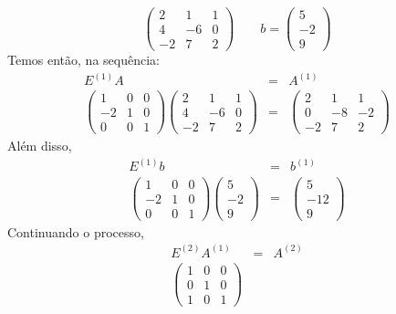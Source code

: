 \begin{exemplo*}
	\begin{equation*}
	   \begin{pmatrix} 2&1&1\\4&-6&0\\-2&7&2 \end{pmatrix} \qquad b =
\begin{pmatrix} 5\\-2\\9 \end{pmatrix}
	\end{equation*}
	Temos então, na sequência:
	\begin{eqnarray*}
		E^{(1)}  A & = & A^{(1)}\\
		\begin{pmatrix}
			1&0&0\\-2&1&0\\0&0&1
		\end{pmatrix}
		\begin{pmatrix}
			2&1&1\\4&-6&0\\-2&7&2
		\end{pmatrix}
		&
		=
		&
		\begin{pmatrix}
			2&1&1\\0&-8&-2\\-2&7&2
		\end{pmatrix}
	\end{eqnarray*}
	Além disso, 
	\begin{eqnarray*}
	   E^{(1)} b &=& b^{(1)}\\
		\begin{pmatrix}
			1&0&0\\-2&1&0\\0&0&1
		\end{pmatrix}
		\begin{pmatrix}
			5\\-2\\9
		\end{pmatrix}
		&=&
		\begin{pmatrix}
			5\\-12\\9
		\end{pmatrix}
	\end{eqnarray*}
	Continuando o processo, 
	\begin{eqnarray*}
		E^{(2)} A^{(1)} & = & A^{(2)}\\
		\begin{pmatrix}
			1&0&0\\0&1&0\\1&0&1

\end{pmatrix}
\end{eqnarray*}
\end{exemplo*}
